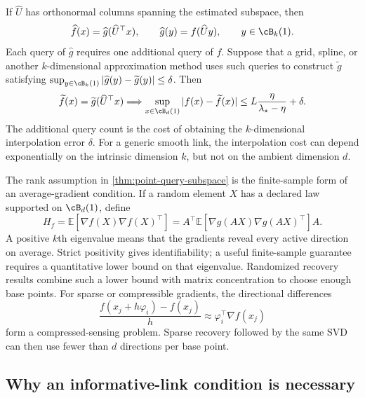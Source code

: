 \documentclass[11pt,twoside]{article}
\newcommand{\E}{\mathbb E}
\theoremstyle{definition}
\theoremstyle{remark}
\begin{document}
If $\widehat U$ has orthonormal columns spanning the estimated subspace, then
\begin{equation}
 \widehat f(x)=\widehat g(\widehat U^\top x),
 \qquad
 \widehat g(y)=f(\widehat Uy),\qquad y\in\cB_k(1).
 \label{eq:recovered-link}
\end{equation}
Each query of $\widehat g$ requires one additional query of $f$. Suppose that
a grid, spline, or another $k$-dimensional approximation method uses such
queries to construct $\widetilde g$ satisfying
$\sup_{y\in\cB_k(1)}|\widehat g(y)-\widetilde g(y)|\leq\delta$. Then
\begin{equation}
 \widetilde f(x)=\widetilde g(\widehat U^\top x)
 \quad\Longrightarrow\quad
 \sup_{x\in\cB_d(1)}|f(x)-\widetilde f(x)|
 \leq L\frac{\eta}{\lambda_\star-\eta}+\delta.
 \label{eq:subspace-plus-link-error}
\end{equation}
The additional query count is the cost of obtaining the $k$-dimensional
interpolation error $\delta$. For a generic smooth link, the interpolation cost can depend
exponentially on the intrinsic dimension $k$, but not on the ambient dimension
$d$.

The rank assumption in \cref{thm:point-query-subspace} is the finite-sample
form of an average-gradient condition. If a random element $X$ has a declared
law supported on $\cB_d(1)$, define
\begin{equation}
 H_f=\E[\nabla f(X)\nabla f(X)^\top]
 =A^\top\E[\nabla g(AX)\nabla g(AX)^\top]A.
 \label{eq:active-query-population-agop}
\end{equation}
A positive $k$th eigenvalue means that the gradients reveal every active
direction on average. Strict positivity gives identifiability; a useful
finite-sample guarantee requires a quantitative lower bound on that eigenvalue.
Randomized recovery results combine such a lower bound with matrix
concentration to choose enough base points. For sparse or compressible
gradients, the directional differences
\begin{equation}
 \frac{f(x_j+h\varphi_i)-f(x_j)}h
 \approx \varphi_i^\top\nabla f(x_j)
 \label{eq:compressed-directional-differences}
\end{equation}
form a compressed-sensing problem. Sparse recovery followed by the same SVD
can then use fewer than $d$ directions per base point.

\subsection{Why an informative-link condition is necessary}
\end{document}
